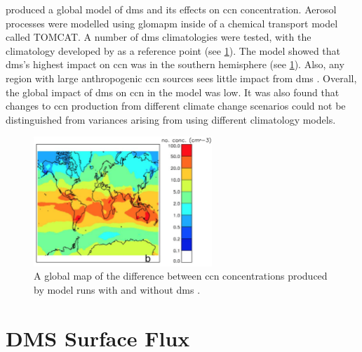 	\citet{woodhouse:2010ed} produced a global model of \gls{dms} and its effects on \gls{ccn} concentration. Aerosol processes were modelled using \gls{glomapm} inside of a chemical transport model called TOMCAT. A number of \gls{dms} climatologies were tested, with the climatology developed by \citet{Kettle:2000jy} as a reference point (see \cref{sec:dmssurf}). The model showed that \gls{dms}'s highest impact on \gls{ccn} was in the southern hemisphere (see \cref{fig:wooddmsccn}). Also, any region with large anthropogenic \gls{ccn} sources sees little impact from \gls{dms} \citep{woodhouse:2010ed}. Overall, the global impact of \gls{dms} on \gls{ccn} in the model was low. It was also found that changes to \gls{ccn} production from different climate change scenarios could not be distinguished from variances arising from using different climatology models.

	\begin{figure}[!htb]
	    \centering
	    \includegraphics[width=0.6\textwidth,natwidth=1462,natheight=1060]{Fig/wooddmsccn.png}
	    \caption{A global map of the difference between \gls{ccn} concentrations produced by model runs with and without \gls{dms} \citep{woodhouse:2010ed}.}
	    \label{fig:wooddmsccn}
	\end{figure}




	\section{DMS Surface Flux}
	\label{sec:dmssurf}

